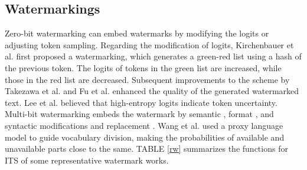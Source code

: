 	\subsection{Watermarkings} 
	Zero-bit watermarking can embed watermarks by modifying the logits or adjusting token sampling. Regarding the modification of logits, Kirchenbauer et al. \cite{KGW2023} first proposed a watermarking, which generates a green-red list using a hash of the previous token. The logits of tokens in the green list are increased, while those in the red list are decreased. Subsequent improvements to the \cite{KGW2023} scheme by Takezawa et al. \cite{NSW2023} and Fu et al. \cite{Fu2024} enhanced the quality of the generated watermarked text. Lee et al. \cite{SWEET2024} believed that high-entropy logits indicate token uncertainty. Multi-bit watermarking embeds the watermark by semantic \cite{AWT2021}, format \cite{Unicode2016}, and syntactic \cite{Robust_Multi-bit2023} modifications and replacement \cite{Context-aware2022}. Wang et al. \cite{CTWL2024} used a proxy language model to guide vocabulary division, making the probabilities of available and unavailable parts close to the same. TABLE \ref{rw} summarizes the functions for ITS of some representative watermark works.
	
